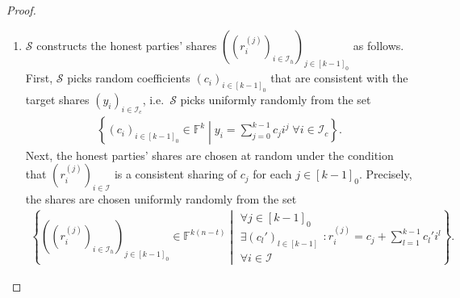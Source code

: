 \documentclass{article}
\newcommand{\set}[2]{\left\{ #1 \middle| #2 \right\}}
\newcommand{\seq}[1]{\left[#1\right]}
\newcommand{\seqZ}[1]{\left[#1\right]_0}
\theoremstyle{remark}
\newcommand{\F}{\mathbb{F}}
\begin{document}
\begin{proof}
\begin{enumerate}
		\item $\mathcal{S}$ constructs the honest parties' shares
			${\left({\left(r_i^{(j)}\right)}_{i \in \mathcal{I}_h}\right)}_{j
			\in \seqZ{k-1}}$ as follows. First, $\mathcal{S}$ picks random
			coefficients ${(c_i)}_{i \in \seqZ{k-1}}$ that are consistent with
			the target shares ${(y_i)}_{i \in \mathcal{I}_c}$, i.e.\
			$\mathcal{S}$ picks uniformly randomly from the set
			\begin{align*}
				\set{%
					{(c_i)}_{i \in \seqZ{k-1}} \in \F^k
				}{%
					y_i = \sum_{j=0}^{k-1} c_j i^j
					\;
					\forall i \in \mathcal{I}_c
				}.
			\end{align*}
			Next, the honest parties' shares are chosen at random under the
			condition that ${\left(r_i^{(j)}\right)}_{i \in \mathcal{I}}$ is a
			consistent sharing of $c_j$ for each $j \in \seqZ{k-1}$. Precisely,
			the shares are chosen uniformly randomly from the set
			\begin{align*}
				\set{%
					{\left(
						{\left(
							r_i^{(j)}
						\right)}_{i \in \mathcal{I}_h}\right)
					}_{j \in \seqZ{k-1}}
					\in
					\F^{k(n-t)}
				}{%
					\begin{matrix}
						\forall j \in \seqZ{k-1}\\
						\exists {(c_l')}_{l \in \seq{k-1}}\\
						\forall i \in \mathcal{I}
					\end{matrix}
					:
					r_i^{(j)} = c_j + \sum_{l=1}^{k-1} c_l' i^l
				}.
			\end{align*}
	\end{enumerate}


\end{proof}
\end{document}
